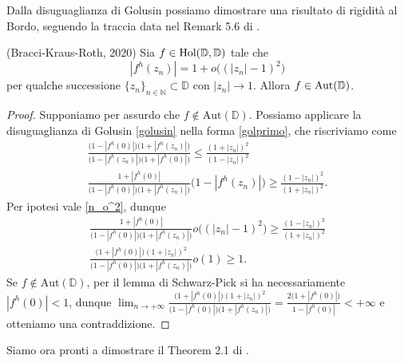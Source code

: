 Dalla disuguaglianza di Golusin possiamo dimostrare una risultato di rigidità al Bordo, seguendo la traccia data nel Remark 5.6 di \cite{BKR}.

\begin{thm} \label{boundary_schwarz_pick}
  (Bracci-Kraus-Roth, 2020) Sia $f \in \text{\normalfont{Hol}}(\mathbb{D},\mathbb{D})$ tale che
  \begin{equation} \label{n_o^2}
    |f^h(z_n)|=1+o\bigl((|z_n|-1)^2\bigr)
  \end{equation}
  per qualche successione $\{z_n\}_{n \in \mathbb{N}} \subset \mathbb{D}$ con $|z_n| \longrightarrow 1$. Allora $f \in \text{\normalfont{Aut}}(\mathbb{D})$.
\end{thm}

\begin{proof}
  Supponiamo per assurdo che $f \not\in \text{Aut}(\mathbb{D})$. Possiamo applicare la disuguaglianza di Golusin \ref{golusin} nella forma \eqref{golprimo}, che riscriviamo come
  \begin{align*}
    \frac{\bigl(1-|f^h(0)|\bigr)\bigl(1+|f^h(z_n)|\bigr)}{\bigl(1-|f^h(z_n)|\bigr)\bigl(1+|f^h(0)|\bigr)} \le \frac{(1+|z_n|)^2}{(1-|z_n|)^2} \\
    \frac{1+|f^h(0)|}{\bigl(1-|f^h(0)|\bigr)\bigl(1+|f^h(z_n)|\bigr)}\bigl(1-|f^h(z_n)|\bigr) \ge \frac{(1-|z_n|)^2}{(1+|z_n|)^2}.
  \end{align*}
  Per ipotesi vale \eqref{n_o^2}, dunque
  \begin{align*}
    \frac{1+|f^h(0)|}{\bigl(1-|f^h(0)|\bigr)\bigl(1+|f^h(z_n)|\bigr)}o\bigl((|z_n|-1)^2\bigr) \ge \frac{(1-|z_n|)^2}{(1+|z_n|)^2} \\
    \frac{\bigl(1+|f^h(0)|\bigr)(1+|z_n|)^2}{\bigl(1-|f^h(0)|\bigr)\bigl(1+|f^h(z_n)|\bigr)}o(1) \ge 1.
  \end{align*}
  Se $f \not\in \text{Aut}(\mathbb{D})$, per il lemma di Schwarz-Pick si ha necessariamente $|f^h(0)|<1$, dunque $\displaystyle \lim_{n \longrightarrow +\infty} \frac{\bigl(1+|f^h(0)|\bigr)(1+|z_n|)^2}{\bigl(1-|f^h(0)|\bigr)\bigl(1+|f^h(z_n)|\bigr)}=\frac{2\bigl(1+|f^h(0)|\bigr)}{1-|f^h(0)|} < +\infty$ e otteniamo una contraddizione.
\end{proof}

Siamo ora pronti a dimostrare il Theorem 2.1 di \cite{BK}.
